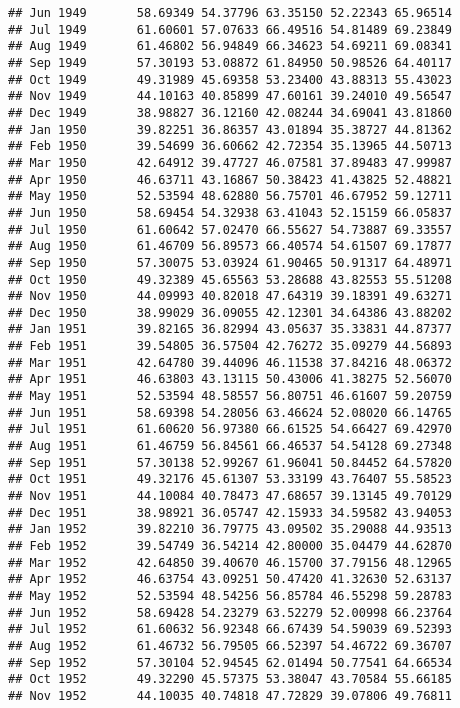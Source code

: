 \documentclass[
]{article}
\begin{document}
\begin{verbatim}
## Jun 1949       58.69349 54.37796 63.35150 52.22343 65.96514
## Jul 1949       61.60601 57.07633 66.49516 54.81489 69.23849
## Aug 1949       61.46802 56.94849 66.34623 54.69211 69.08341
## Sep 1949       57.30193 53.08872 61.84950 50.98526 64.40117
## Oct 1949       49.31989 45.69358 53.23400 43.88313 55.43023
## Nov 1949       44.10163 40.85899 47.60161 39.24010 49.56547
## Dec 1949       38.98827 36.12160 42.08244 34.69041 43.81860
## Jan 1950       39.82251 36.86357 43.01894 35.38727 44.81362
## Feb 1950       39.54699 36.60662 42.72354 35.13965 44.50713
## Mar 1950       42.64912 39.47727 46.07581 37.89483 47.99987
## Apr 1950       46.63711 43.16867 50.38423 41.43825 52.48821
## May 1950       52.53594 48.62880 56.75701 46.67952 59.12711
## Jun 1950       58.69454 54.32938 63.41043 52.15159 66.05837
## Jul 1950       61.60642 57.02470 66.55627 54.73887 69.33557
## Aug 1950       61.46709 56.89573 66.40574 54.61507 69.17877
## Sep 1950       57.30075 53.03924 61.90465 50.91317 64.48971
## Oct 1950       49.32389 45.65563 53.28688 43.82553 55.51208
## Nov 1950       44.09993 40.82018 47.64319 39.18391 49.63271
## Dec 1950       38.99029 36.09055 42.12301 34.64386 43.88202
## Jan 1951       39.82165 36.82994 43.05637 35.33831 44.87377
## Feb 1951       39.54805 36.57504 42.76272 35.09279 44.56893
## Mar 1951       42.64780 39.44096 46.11538 37.84216 48.06372
## Apr 1951       46.63803 43.13115 50.43006 41.38275 52.56070
## May 1951       52.53594 48.58557 56.80751 46.61607 59.20759
## Jun 1951       58.69398 54.28056 63.46624 52.08020 66.14765
## Jul 1951       61.60620 56.97380 66.61525 54.66427 69.42970
## Aug 1951       61.46759 56.84561 66.46537 54.54128 69.27348
## Sep 1951       57.30138 52.99267 61.96041 50.84452 64.57820
## Oct 1951       49.32176 45.61307 53.33199 43.76407 55.58523
## Nov 1951       44.10084 40.78473 47.68657 39.13145 49.70129
## Dec 1951       38.98921 36.05747 42.15933 34.59582 43.94053
## Jan 1952       39.82210 36.79775 43.09502 35.29088 44.93513
## Feb 1952       39.54749 36.54214 42.80000 35.04479 44.62870
## Mar 1952       42.64850 39.40670 46.15700 37.79156 48.12965
## Apr 1952       46.63754 43.09251 50.47420 41.32630 52.63137
## May 1952       52.53594 48.54256 56.85784 46.55298 59.28783
## Jun 1952       58.69428 54.23279 63.52279 52.00998 66.23764
## Jul 1952       61.60632 56.92348 66.67439 54.59039 69.52393
## Aug 1952       61.46732 56.79505 66.52397 54.46722 69.36707
## Sep 1952       57.30104 52.94545 62.01494 50.77541 64.66534
## Oct 1952       49.32290 45.57375 53.38047 43.70584 55.66185
## Nov 1952       44.10035 40.74818 47.72829 39.07806 49.76811

\end{verbatim}
\end{document}
